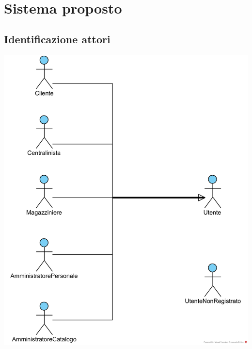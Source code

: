 \documentclass[12pt,a4paper]{article}
\begin{document}
\section{Sistema proposto}
 
\subsection{Identificazione attori}
\begin{center}
\includegraphics[width=\textwidth]{IdentificazioneAttori}
\end{center}
 
\end{document}
